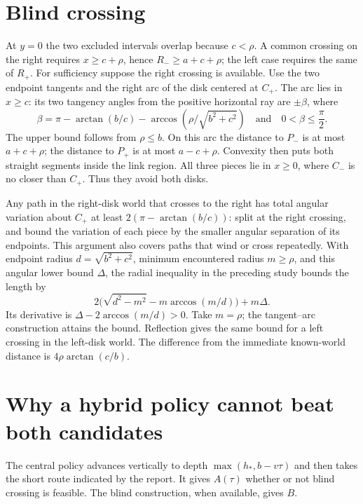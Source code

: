 \documentclass[11pt]{article}
\begin{document}
\section{Blind crossing}
At \(y=0\) the two excluded intervals overlap because \(c<\rho\).
A common crossing on the right requires \(x\ge c+\rho\), hence
\(R_-\ge a+c+\rho\); the left case requires the same of \(R_+\).
For sufficiency suppose the right crossing is available. Use
the two endpoint tangents and the right arc of the disk centered
at \(C_+\). The arc lies in \(x\ge c\): its two tangency angles
from the positive horizontal ray are \(\pm\beta\), where
\[
 \beta=\pi-\arctan(b/c)-\arccos(\rho/\sqrt{b^2+c^2})
 \quad\text{and}\quad 0<\beta\le\frac{\pi}{2}.
\]
The upper bound follows from \(\rho\le b\).
On this arc the distance to \(P_-\) is at most \(a+c+\rho\);
the distance to \(P_+\) is at most \(a-c+\rho\). Convexity
then puts both straight segments inside the link region.
All three pieces lie in \(x\ge0\), where \(C_-\) is no closer
than \(C_+\). Thus they avoid both disks.

Any path in the right-disk world that crosses to the right
has total angular variation about \(C_+\) at least
\(2(\pi-\arctan(b/c))\): split at the right crossing, and
bound the variation of each piece by the smaller angular
separation of its endpoints. This argument also covers
paths that wind or cross repeatedly. With endpoint radius
\(d=\sqrt{b^2+c^2}\), minimum encountered radius \(m\ge\rho\),
and this angular lower bound \(\Delta\), the radial inequality
in the preceding study bounds the length by
\[
  2\bigl(\sqrt{d^2-m^2}-m\arccos(m/d)\bigr)+m\Delta.
\]
Its derivative is \(\Delta-2\arccos(m/d)>0\). Take
\(m=\rho\); the tangent--arc construction attains the bound.
Reflection gives the same bound for a left crossing in
the left-disk world. The difference from the immediate
known-world distance is \(4\rho\arctan(c/b)\).

\section{Why a hybrid policy cannot beat both candidates}
The central policy advances vertically to depth
\(\max(h_*,b-v\tau)\) and then takes the short route indicated
by the report. It gives \(A(\tau)\) whether or not blind
crossing is feasible. The blind construction, when available,
gives \(B\).
\end{document}
